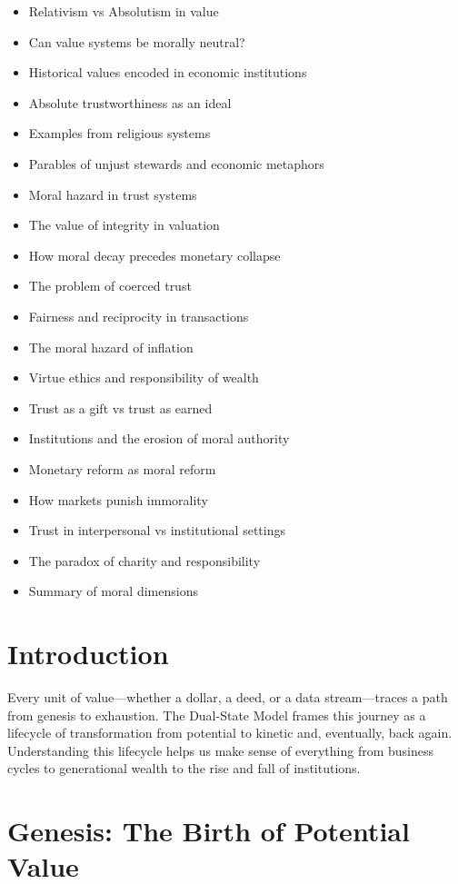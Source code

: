 \documentclass[11pt,oneside]{book}
\begin{document}
\begin{itemize}
\item Relativism vs Absolutism in value
\item Can value systems be morally neutral?
\item Historical values encoded in economic institutions
\item Absolute trustworthiness as an ideal
\item Examples from religious systems
\item Parables of unjust stewards and economic metaphors
\item Moral hazard in trust systems
\item The value of integrity in valuation
\item How moral decay precedes monetary collapse
\item The problem of coerced trust
\item Fairness and reciprocity in transactions
\item The moral hazard of inflation
\item Virtue ethics and responsibility of wealth
\item Trust as a gift vs trust as earned
\item Institutions and the erosion of moral authority
\item Monetary reform as moral reform
\item How markets punish immorality
\item Trust in interpersonal vs institutional settings
\item The paradox of charity and responsibility
\item Summary of moral dimensions
\end{itemize}


\section{Introduction}

Every unit of value—whether a dollar, a deed, or a data stream—traces a path from genesis to exhaustion. The Dual-State Model frames this journey as a lifecycle of transformation from potential to kinetic and, eventually, back again. Understanding this lifecycle helps us make sense of everything from business cycles to generational wealth to the rise and fall of institutions.

\section{Genesis: The Birth of Potential Value}
\end{document}
